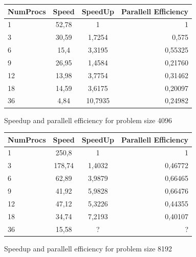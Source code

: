\begin{figure}[ht]
    \begin{tabular}{l | c | c | r}
        NumProcs & Speed & SpeedUp & Parallell Efficiency \\
        \hline
        1 & 52,78 & 1 & 1 \\
        3 & 30,59 & 1,7254 & 0,575 \\
        6 & 15,4 & 3,3195 & 0,55325 \\
        9 & 26,95 & 1,4584 & 0,21760 \\
        12 & 13,98 & 3,7754 & 0,31462 \\
        18 & 14,59 & 3,6175 & 0,20097 \\
        36 & 4,84 & 10,7935 & 0,24982 \\
        \hline
    \end{tabular}
    \caption{Speedup and parallell efficiency for problem size 4096}
\end{figure}

\begin{figure}[ht]
       \begin{tabular}{l | c | c | r}
        NumProcs & Speed & SpeedUp & Parallell Efficiency \\
        \hline
        1 & 250,8 & 1 & 1 \\
        3 & 178,74 & 1,4032 & 0,46772 \\
        6 & 62,89 & 3,9879 & 0,66465 \\
        9 & 41,92 & 5,9828 & 0,66476 \\
        12 & 47,12 & 5,3226 & 0,44355 \\
        18 & 34,74 & 7,2193 & 0,40107 \\
        36 & 15,58 & ? & ? \\
        \hline
    \end{tabular}
\caption{Speedup and parallell efficiency for problem size 8192}
\end{figure}
\FloatBarrier